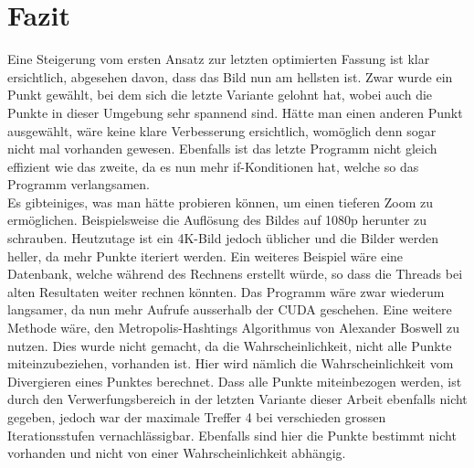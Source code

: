 \section{Fazit}
Eine Steigerung vom ersten Ansatz zur letzten optimierten Fassung ist klar ersichtlich, abgesehen davon, dass das Bild nun am hellsten ist. Zwar wurde ein Punkt gewählt, bei dem sich die letzte Variante gelohnt hat, wobei auch die Punkte in dieser Umgebung sehr spannend sind. Hätte man einen anderen Punkt ausgewählt, wäre keine klare Verbesserung ersichtlich, womöglich denn sogar nicht mal vorhanden gewesen. Ebenfalls ist das letzte Programm nicht gleich effizient wie das zweite, da es nun mehr if-Konditionen hat, welche so das Programm verlangsamen.\\
Es gibteiniges, was man hätte probieren können, um einen tieferen Zoom zu ermöglichen. Beispielsweise die Auflösung des Bildes auf 1080p herunter zu schrauben. Heutzutage ist ein 4K-Bild jedoch üblicher und die Bilder werden heller, da mehr Punkte iteriert werden. Ein weiteres Beispiel wäre eine Datenbank, welche während des Rechnens erstellt würde, so dass die Threads bei alten Resultaten weiter rechnen könnten. Das Programm wäre zwar wiederum langsamer, da nun mehr Aufrufe ausserhalb der CUDA geschehen. Eine weitere Methode wäre, den Metropolis-Hashtings Algorithmus von Alexander Boswell zu nutzen. Dies wurde nicht gemacht, da die Wahrscheinlichkeit, nicht alle Punkte miteinzubeziehen, vorhanden ist. Hier wird nämlich die Wahrscheinlichkeit vom Divergieren eines Punktes berechnet. Dass alle Punkte miteinbezogen werden, ist durch den Verwerfungsbereich in der letzten Variante dieser Arbeit ebenfalls nicht gegeben, jedoch war der maximale Treffer 4 bei verschieden grossen Iterationsstufen vernachlässigbar. Ebenfalls sind hier die Punkte bestimmt nicht vorhanden und nicht von einer Wahrscheinlichkeit abhängig.